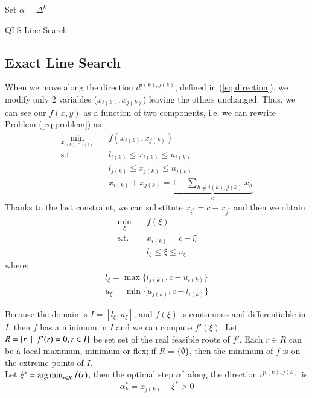  \begin{algorithm}[ht]
 Set $\alpha = \Delta^{k}$\\
 \caption{QLS Line Search}
\end{algorithm}

\subsection{Exact Line Search}
When we move along the direction $d^{i(k),j(k)}$, defined in (\ref{eq:direction}), we modify only 2 variables ($x_{i(k)}, x_{j(k)}$) leaving the others unchanged. Thus, we can see our $f(x,y)$ as a function of two components, i.e. we can rewrite Problem (\ref{eq:problem}) as
\begin{subequations}\label{eq:twocomp} 
\begin{align}
\min_{x_{i(k)}, x_{j(k)}} & \quad f(x_{i(k)}, x_{j(k)})  \\
\text{s.t.} & \quad l_{i(k)} \leq x_{i(k)}  \leq u_{i(k)} \\
& \quad l_{j(k)} \leq x_{j(k)}  \leq u_{j(k)} \\
& \quad x_{i(k)}+x_{j(k)} = \underbrace{1-\sum_{h\ne {i(k)},{j(k)}}x_h}_c
\end{align}
\end{subequations}
Thanks to the last constraint, we can substitute $x_{i^*} = c - x_{j^*}$ and then we obtain
\begin{subequations}\label{eq:onecomp} 
\begin{align}
\min_{\xi} & \quad f(\xi) \\
\text{s.t.} & \quad x_{i(k)} = c - \xi \\
& \quad l_{\xi} \leq \xi \leq u_{\xi}
\end{align}
\end{subequations}
where:
\begin{equation}
\begin{align}
 l_{\xi} = \max\{l_{j(k)}, c - u_{i(k)}\}\\
 u_{\xi}= \min \{ u_{j(k)}, c-l_{i(k)}\}  
 \end{align}
\end{equation}

Because the domain is $I=[l_{\xi}, u_{\xi}]$, and $f(\xi)$ is continuous and differentiable in $I$, then $f$ has a minimum in $I$ and we can compute $f'(\xi)$. Let $R = \{ r \enskip | \enskip f'(r) = 0, r \in I \}$ be set set of the real feasible roots of $f'$. Each $r \in R$ can be a local maximum, minimum or flex; if $R = \{ \emptyset \}$, then the minimum of $f$ is on the extreme points of $I$.\\ 
Let $\xi^* = \operatorname*{arg\,min}_{r \in R} f(r)$, then the optimal step $\alpha^*$ along the direction $d^{i(k),j(k)}$ is
\begin{equation}
\alpha_k^* = x_{j(k)} - \xi^* > 0
\end{equation} 
